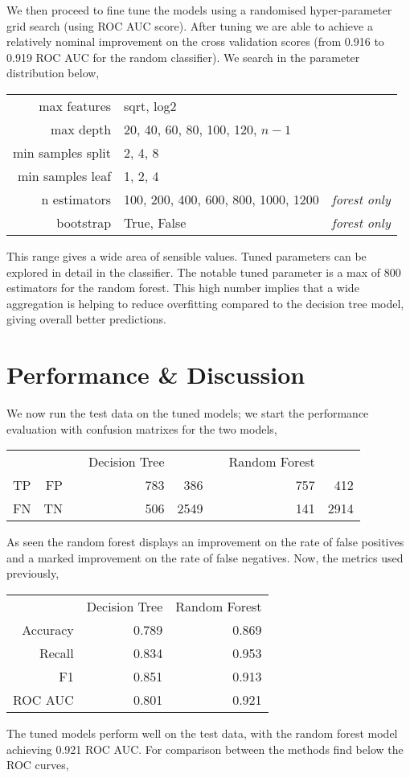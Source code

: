 \documentclass[11pt,a4paper]{article}
\begin{document}
We then proceed to fine tune the models using a randomised hyper-parameter grid search (using ROC AUC score). After tuning we are able to achieve a relatively nominal improvement on the cross validation scores (from 0.916 to 0.919 ROC AUC for the random classifier).  We search in the parameter distribution below,
\begin{center}
\begin{tabular}{ rlr } 
max features & sqrt, log2 & \\
max depth & 20, 40, 60, 80, 100, 120, $n-1$& \\
min samples split & 2, 4, 8& \\
min samples leaf & 1, 2, 4& \\
n estimators & 100, 200, 400, 600, 800, 1000, 1200& \it{forest only}\\
bootstrap&True, False&\it{forest} only
\end{tabular}
\end{center}
This range gives a wide area of sensible values. Tuned parameters can be explored in detail in the classifier. The notable tuned parameter is a max of 800 estimators for the random forest. This high number implies that a wide aggregation is helping to reduce overfitting compared to the decision tree model, giving overall better predictions.

\section{Performance \& Discussion}
We now run the test data on the tuned models; we start the performance evaluation with confusion matrixes for the two models,

\begin{center}
\begin{tabular}{ rrrrrrrr } 
      &        & & Decision Tree & & & Random Forest& \\ 
TP & FP & &  783 & 386 & & 757 & 412\\ 
FN & TN & &  506 & 2549 & & 141 & 2914 \\
\end{tabular}
\end{center}

As seen the random forest displays an improvement on the rate of false positives and a marked improvement on the rate of false negatives. Now, the metrics used previously,

\begin{center}
\begin{tabular}{ rrr } 
& Decision Tree & Random Forest \\ 
 Accuracy & 0.789 & 0.869 \\ 
 Recall & 0.834 & 0.953 \\
 F1 & 0.851 & 0.913 \\
 ROC AUC & 0.801 & 0.921
\end{tabular}
\end{center}
The tuned models perform well on the test data, with the random forest model achieving 0.921 ROC AUC. For comparison between the methods find below the ROC curves,
\end{document}
